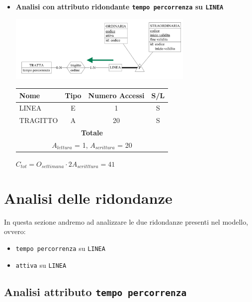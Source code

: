 \documentclass[12pt,a4paper]{report}
\begin{document}
\begin{enumerate}[label=\textbf{\arabic*}]
\begin{itemize}
	\item \textbf{Analisi con attributo ridondante \texttt{tempo percorrenza} su \texttt{LINEA}}
	\begin{center}
	\includegraphics[width=0.7\textwidth]{InserimentoLineaNoRid}
	\end{center}
	\begin{table}[H]
	\centering
	\begin{tabular}{|l|c|c|c|}
	\hline
	Nome & Tipo & Numero Accessi & S/L \\
	\hline
	LINEA & E & 1 & S \\
	\hline
	TRAGITTO & A & 20 & S \\
	\hline
	    \multicolumn{4}{c}{\textbf{Totale}} \\
	    \multicolumn{4}{c}{${A_{lettura}}$ = 1, ${A_{scrittura}}$ = 20} \\
	    \hline
	    \end{tabular}
	    \end{table}
	    \begin{center}
	    ${C_{tot} = {O_{settimana}}\cdot{2A_{scritttura}}= 41}$
	    \end{center}
	\end{itemize}
\end{enumerate}

\section{Analisi delle ridondanze}
In questa sezione andremo ad analizzare le due ridondanze presenti nel modello, ovvero:
\begin{itemize}
  \item \texttt{tempo percorrenza} su \texttt{LINEA}
  \item \texttt{attiva} su \texttt{LINEA}
\end{itemize}

\subsection{Analisi attributo \texttt{tempo percorrenza}}
\end{document}
